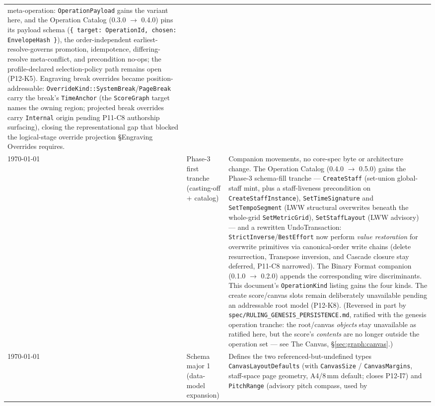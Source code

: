 \documentclass[11pt,letterpaper]{report}
\newcommand{\sectionsc}[1]{{\addfontfeatures{Letters=SmallCaps}#1}}
\begin{document}
\begin{longtable}{p{2cm} p{2.5cm} p{9cm}}
  meta-operation: \texttt{OperationPayload} gains the variant here,
  and the Operation Catalog (0.3.0 $\rightarrow$ 0.4.0) pins its
  payload schema (\texttt{\{ target: OperationId, chosen:
  EnvelopeHash \}}), the order-independent
  earliest-resolve-governs promotion, idempotence, differing-resolve
  meta-conflict, and precondition no-ops; the profile-declared
  selection-policy path remains open (P12-K5). Engraving break
  overrides became position-addressable:
  \texttt{OverrideKind::SystemBreak}/\texttt{PageBreak} carry the
  break's \texttt{TimeAnchor} (the \texttt{ScoreGraph} target names
  the owning region; projected break overrides carry
  \texttt{Internal} origin pending P11-C8 authorship surfacing),
  closing the representational gap that blocked the logical-stage
  override projection §Engraving Overrides requires.
  \\
  \today & Phase-3 first tranche (casting-off + catalog) &
  Companion movements, no core-spec byte or architecture change. The
  Operation Catalog (0.4.0 $\rightarrow$ 0.5.0) gains the Phase-3
  schema-fill tranche --- \texttt{CreateStaff} (set-union global-staff
  mint, plus a staff-liveness precondition on
  \texttt{CreateStaffInstance}), \texttt{SetTimeSignature} and
  \texttt{SetTempoSegment} (LWW structural overwrites beneath the
  whole-grid \texttt{SetMetricGrid}), \texttt{SetStaffLayout} (LWW
  advisory) --- and a rewritten \sectionsc{UndoTransaction}:
  \texttt{StrictInverse}/\texttt{BestEffort} now perform
  \emph{value restoration} for overwrite primitives via
  canonical-order write chains (delete resurrection, Transpose
  inversion, and Cascade closure stay deferred, P11-C8 narrowed).
  The Binary Format companion (0.1.0 $\rightarrow$ 0.2.0) appends
  the corresponding wire discriminants. This document's
  \texttt{OperationKind} listing gains the four kinds. The create
  score/canvas slots remain deliberately unavailable pending an
  addressable root model (P12-K8). (Reversed in part by
  \texttt{spec/RULING\_GENESIS\_PERSISTENCE.md}, ratified with the genesis
  operation tranche: the root/canvas \emph{objects} stay unavailable as
  ratified here, but the score's \emph{contents} are no longer outside the
  operation set --- see \sectionsc{The Canvas}, \S\ref{sec:graph:canvas}.)
  \\
  \today & Schema major 1 (data-model expansion) &
  Defines the two referenced-but-undefined types
  \texttt{CanvasLayoutDefaults} (with \texttt{CanvasSize} /
  \texttt{CanvasMargins}, staff-space page geometry, A4/8\,mm default;
  closes P12-I7) and \texttt{PitchRange} (advisory pitch compass, used by

\end{longtable}
\end{document}
